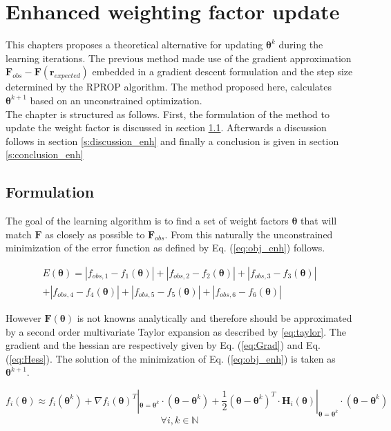 \chapter{Enhanced weighting factor update}
\label{cha:Enhancement}

This chapters proposes a theoretical alternative for updating $\bm{\theta}^k$ during the learning iterations. The previous method made use of the gradient approximation $\bm{F}_{obs} - \bm{F}(\bm{r}_{expected})$ embedded in a gradient descent formulation and the step size determined by the RPROP algorithm. The method proposed here, calculates $\bm{\theta}^{k+1}$ based on an unconstrained optimization.\\

The chapter is structured as follows. First, the formulation of the method to update the weight factor is discussed in section \ref{s:formulation_enh}. Afterwards a discussion follows in section \ref{s:discussion_enh} and finally a conclusion is given in section \ref{s:conclusion_enh}
\section{Formulation}\label{s:formulation_enh}
The goal of the learning algorithm is to find a set of weight factors $\bm{\theta}$ that will match $\bm{F}$ as closely as possible to $\bm{F}_{obs}$. From this naturally the unconstrained minimization of the error function as defined by Eq. (\ref{eq:obj_enh}) follows.

\begin{multline}\label{eq:obj_enh}
E(\bm{\theta}) = |f_{obs,1} - f_1(\bm{\theta})|+|f_{obs,2} - f_2(\bm{\theta})|+|f_{obs,3} - f_3(\bm{\theta})|\\
+|f_{obs,4} - f_4(\bm{\theta})|+|f_{obs,5} - f_5(\bm{\theta})|+|f_{obs,6} - f_6(\bm{\theta})|
\end{multline}

However $\bm{F}(\bm{\theta})$ is not knowns analytically and therefore should be approximated by a second order multivariate Taylor expansion as described by \ref{eq:taylor}. The gradient and the hessian are respectively given by Eq. (\ref{eq:Grad}) and Eq. (\ref{eq:Hess}). The solution of the minimization of Eq. (\ref{eq:obj_enh}) is taken as $\bm{\theta}^{k+1}$.

\begin{equation}\label{eq:taylor}
	f_i({\bm{\theta}}) \approx f_i(\bm{\theta}^k) + \nabla f_i(\bm{\theta})^T|_{\bm{\theta} = \bm{\theta}^k}\cdot (\bm{\theta} - \bm{\theta}^k) + \frac{1}{2}(\bm{\theta} - \bm{\theta}^k)^T\cdot \bm{H}_i(\bm{\theta})|_{\bm{\theta} = \bm{\theta}^k}\cdot(\bm{\theta} - \bm{\theta}^k)
\end{equation}
\[\forall i,k \in \mathbb{N}\]

